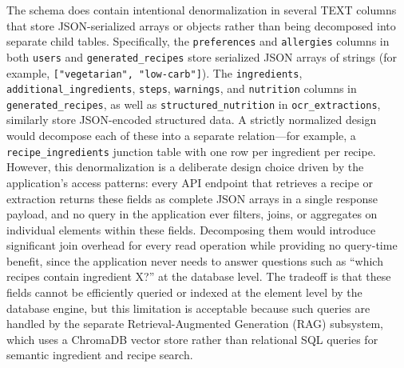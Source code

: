 The schema does contain intentional denormalization in several TEXT
columns that store JSON-serialized arrays or objects rather than
being decomposed into separate child tables. Specifically, the
\texttt{preferences} and \texttt{allergies} columns in both
\texttt{users} and \texttt{generated\_recipes} store serialized JSON
arrays of strings (for example, \texttt{["vegetarian",
"low-carb"]}). The \texttt{ingredients},
\texttt{additional\_ingredients}, \texttt{steps}, \texttt{warnings},
and \texttt{nutrition} columns in \texttt{generated\_recipes}, as
well as \texttt{structured\_nutrition} in
\texttt{ocr\_extractions}, similarly store JSON-encoded structured
data. A strictly normalized design would decompose each of these
into a separate relation---for example, a
\texttt{recipe\_ingredients} junction table with one row per
ingredient per recipe. However, this denormalization is a deliberate
design choice driven by the application's access patterns: every
API endpoint that retrieves a recipe or extraction returns these
fields as complete JSON arrays in a single response payload, and no
query in the application ever filters, joins, or aggregates on
individual elements within these fields. Decomposing them would
introduce significant join overhead for every read operation while
providing no query-time benefit, since the application never needs
to answer questions such as ``which recipes contain ingredient X?''
at the database level. The tradeoff is that these fields cannot be
efficiently queried or indexed at the element level by the database
engine, but this limitation is acceptable because such queries are
handled by the separate Retrieval-Augmented Generation (RAG)
subsystem, which uses a ChromaDB vector store rather than relational
SQL queries for semantic ingredient and recipe search.
